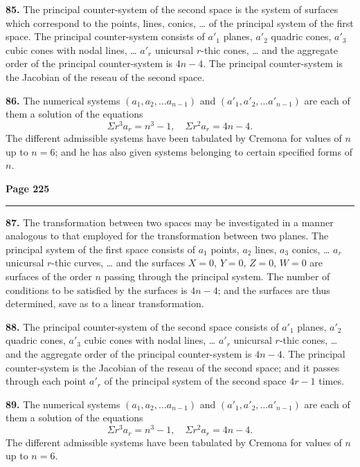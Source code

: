 \documentclass[12pt,a4paper]{article}
\theoremstyle{plain}
\theoremstyle{definition}
\theoremstyle{remark}
\begin{document}
\textbf{85.} The principal counter-system of the second space is the system of surfaces which correspond to the points, lines, conics, \ldots{} of the principal system of the first space. The principal counter-system consists of $a'_1$ planes, $a'_2$ quadric cones, $a'_3$ cubic cones with nodal lines, \ldots{} $a'_r$ unicursal $r$-thic cones, \ldots{} and the aggregate order of the principal counter-system is $4n - 4$. The principal counter-system is the Jacobian of the reseau of the second space.

\textbf{86.} The numerical systems $(a_1, a_2, \ldots a_{n-1})$ and $(a'_1, a'_2, \ldots a'_{n-1})$ are each of them a solution of the equations
\[
\Sigma r^3 a_r = n^3 - 1, \quad \Sigma r^2 a_r = 4n - 4.
\]
The different admissible systems have been tabulated by Cremona for values of $n$ up to $n = 6$; and he has also given systems belonging to certain specified forms of $n$.

\newpage
\noindent\textbf{Page 225}\\
\noindent\rule{\textwidth}{0.4pt}

\smallskip

\noindent\textbf{87.} The transformation between two spaces may be investigated in a manner analogous to that employed for the transformation between two planes. The principal system of the first space consists of $a_1$ points, $a_2$ lines, $a_3$ conics, \ldots{} $a_r$ unicursal $r$-thic curves, \ldots{} and the surfaces $X = 0$, $Y = 0$, $Z = 0$, $W = 0$ are surfaces of the order $n$ passing through the principal system. The number of conditions to be satisfied by the surfaces is $4n - 4$; and the surfaces are thus determined, save as to a linear transformation.

\textbf{88.} The principal counter-system of the second space consists of $a'_1$ planes, $a'_2$ quadric cones, $a'_3$ cubic cones with nodal lines, \ldots{} $a'_r$ unicursal $r$-thic cones, \ldots{} and the aggregate order of the principal counter-system is $4n - 4$. The principal counter-system is the Jacobian of the reseau of the second space; and it passes through each point $a'_r$ of the principal system of the second space $4r - 1$ times.

\textbf{89.} The numerical systems $(a_1, a_2, \ldots a_{n-1})$ and $(a'_1, a'_2, \ldots a'_{n-1})$ are each of them a solution of the equations
\[
\Sigma r^3 a_r = n^3 - 1, \quad \Sigma r^2 a_r = 4n - 4.
\]
The different admissible systems have been tabulated by Cremona for values of $n$ up to $n = 6$.
\end{document}
